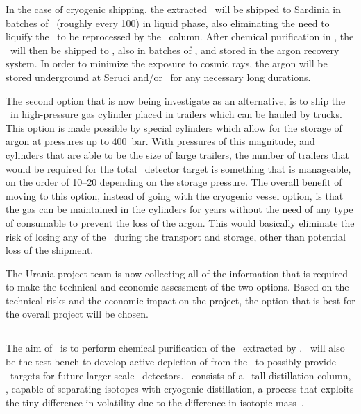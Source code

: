 In the case of cryogenic shipping, the extracted \UAr\ will be shipped to Sardinia in batches of \UraniaUArShipmentMass\ (roughly every \SI{100}{\days}) in liquid phase, also eliminating the need to liquify the \UAr\ to be reprocessed by the \Aria\ column. After chemical purification in \Aria, the \UAr\ will then be shipped to \LNGS, also in batches of \UraniaUArShipmentMass, and stored in the argon recovery system.  In order to minimize the exposure to cosmic rays, the argon will be stored underground at Seruci and/or \LNGS\ for any necessary long durations.

The second option that is now being investigate as an alternative, is to ship the \UAr\ in high-pressure gas cylinder placed in trailers which can be hauled by trucks.  This option is made possible by special cylinders which allow for the storage of argon at pressures up to \SI{400}{\bar}.  With pressures of this magnitude, and cylinders that are able to be the size of large trailers, the number of trailers that would be required for the total \DSks\ detector target is something that is manageable, on the order of \numrange{10}{20} depending on the storage pressure.  The overall benefit of moving to this option, instead of going with the cryogenic vessel option, is that the gas can be maintained in the cylinders for years without the need of any type of consumable to prevent the loss of the argon.  This would basically eliminate the risk of losing any of the \UAr\ during the transport and storage, other than potential loss of the shipment.

The Urania project team is now collecting all of the information that is required to make the technical and economic assessment of the two options.  Based on the technical risks and the economic impact on the project, the option that is best for the overall project will be chosen.


\subsection{\Aria}
The aim of  \Aria\ is to perform chemical purification of the \UAr\ extracted by \Urania.  \Aria\ will also be the test bench to develop active depletion of  from the \UAr\ to possibly provide \DAr\ targets for future larger-scale \LAr\ detectors.  \Aria\ consists of a \AriaSeruciHeight\ tall distillation column, \SeruciOne, capable of separating isotopes with cryogenic distillation, a process that exploits the tiny difference in volatility due to the difference in isotopic mass~\cite{Lindemann:1919bq,Urey:1932gl,deBoer:1948br,deBoer:1948fc,deBoer:1939cs,Bigeleisen:1961cm}.


